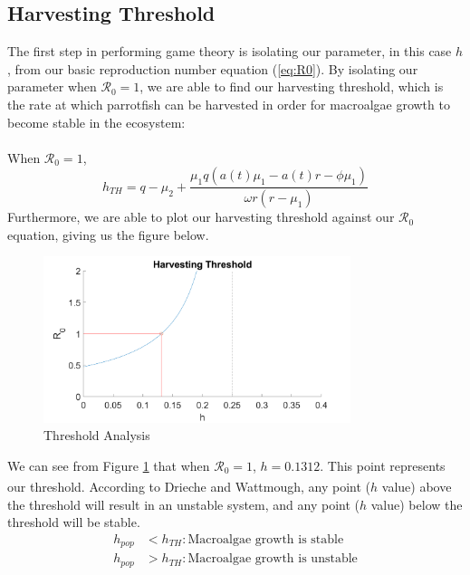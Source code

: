 \documentclass[12pt]{article}
\begin{document}
\subsection{Harvesting Threshold}
The first step in performing game theory is isolating our parameter, in this case $h$, from our basic reproduction number equation (\ref{eq:R0}). By isolating our parameter when $\mathscr{R}_0 = 1$, we are able to find our harvesting threshold, which is the rate at which parrotfish can be harvested in order for macroalgae growth to become stable in the ecosystem:\\
\\
When $\mathscr{R}_{0} = 1$,
\begin{equation*}\label{eq:h_TH}
    \displaystyle{h_{TH} = q - \mu_{2} + \frac{\mu_{1}q(a(t) \mu_{1} - a(t)r - \phi \mu_{1})}{\omega r(r-\mu_{1})}}
\end{equation*}
Furthermore, we are able to plot our harvesting threshold against our $\mathscr{R}_{0}$ equation, giving us the figure below.
\begin{figure}[H]
    \centering
    \includegraphics[width=0.8\textwidth]{Latex/Figures/Graphs/threshold_graph.png}
    \caption{Threshold Analysis}
    \label{fig:threshold_graph}
\end{figure}
We can see from Figure \ref{fig:threshold_graph} that when $\mathscr{R}_{0} = 1$, $h=0.1312$. This point represents our threshold. According to Drieche and Wattmough\textsuperscript{\cite{bible}}, any point ($h$ value) above the threshold will result in an unstable system, and any point ($h$ value) below the threshold will be stable.
\begin{align*}
    h_{pop} &< h_{TH}: \text{Macroalgae growth is stable} \\
    h_{pop} &> h_{TH}: \text{Macroalgae growth is unstable}
\end{align*}
\end{document}
